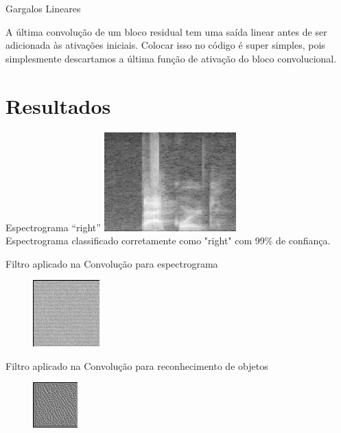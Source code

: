 \documentclass[10pt, compress]{beamer}
\begin{document}
\begin{frame}{Gargalos Lineares}

A última convolução de um bloco residual tem uma \alert{saída linear} antes de ser adicionada às ativações iniciais. Colocar isso no código é super simples, pois simplesmente descartamos a última função de ativação do bloco convolucional.
\end{frame}

\section{Resultados} %

\begin{frame}{Espectrograma ``right''}
\centering
\includegraphics[scale=0.5]{images/process-2.png}\\
Espectrograma classificado corretamente como "right" com \alert{99\%} de confiança.
\end{frame}

\begin{frame}{Filtro aplicado na Convolução para espectrograma}
\begin{figure}
\centering
\includegraphics[scale=6]{images/filtrospeech.png} 
\end{figure}
\end{frame}

\begin{frame}{Filtro aplicado na Convolução para reconhecimento de objetos}
\begin{figure}
\centering
\includegraphics[scale=8]{images/filtroobj.png}
\end{figure}
\end{frame}
\end{document}
